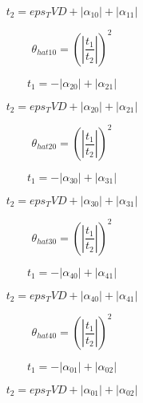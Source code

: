 \documentclass{article}
\begin{document}
\begin{dmath}t_{2} = eps_TVD + \left|{\alpha_{10}}\right| + \left|{\alpha_{11}}\right|\end{dmath}

\begin{dmath}\theta_{hat 10} = \left(\left|{\frac{t_{1}}{t_{2}}}\right| \right)^{2}\end{dmath}

\begin{dmath}t_{1} = - \left|{\alpha_{20}}\right| + \left|{\alpha_{21}}\right|\end{dmath}

\begin{dmath}t_{2} = eps_TVD + \left|{\alpha_{20}}\right| + \left|{\alpha_{21}}\right|\end{dmath}

\begin{dmath}\theta_{hat 20} = \left(\left|{\frac{t_{1}}{t_{2}}}\right| \right)^{2}\end{dmath}

\begin{dmath}t_{1} = - \left|{\alpha_{30}}\right| + \left|{\alpha_{31}}\right|\end{dmath}

\begin{dmath}t_{2} = eps_TVD + \left|{\alpha_{30}}\right| + \left|{\alpha_{31}}\right|\end{dmath}

\begin{dmath}\theta_{hat 30} = \left(\left|{\frac{t_{1}}{t_{2}}}\right| \right)^{2}\end{dmath}

\begin{dmath}t_{1} = - \left|{\alpha_{40}}\right| + \left|{\alpha_{41}}\right|\end{dmath}

\begin{dmath}t_{2} = eps_TVD + \left|{\alpha_{40}}\right| + \left|{\alpha_{41}}\right|\end{dmath}

\begin{dmath}\theta_{hat 40} = \left(\left|{\frac{t_{1}}{t_{2}}}\right| \right)^{2}\end{dmath}

\begin{dmath}t_{1} = - \left|{\alpha_{01}}\right| + \left|{\alpha_{02}}\right|\end{dmath}

\begin{dmath}t_{2} = eps_TVD + \left|{\alpha_{01}}\right| + \left|{\alpha_{02}}\right|\end{dmath}
\end{document}
